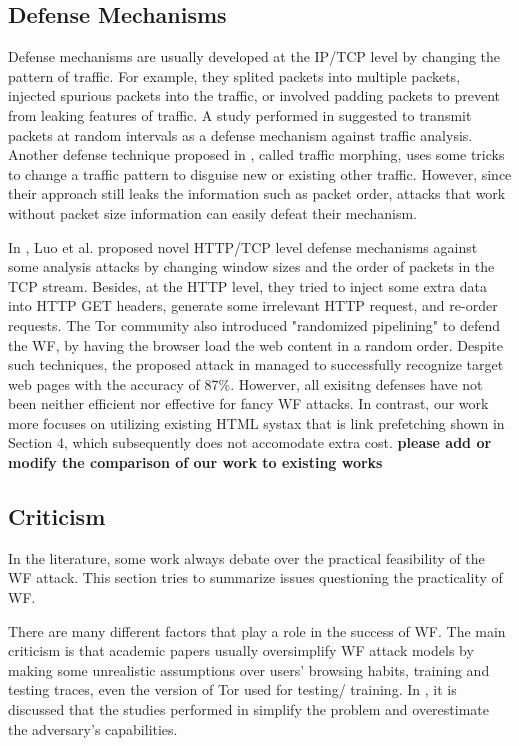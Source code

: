 \subsection{Defense Mechanisms}
Defense mechanisms are usually developed at the IP/TCP level by changing the pattern of traffic. For example, they splited packets into multiple packets, injected spurious packets into the traffic, or involved  padding packets to prevent from leaking features of traffic. A study performed in \cite{fu2003} suggested to transmit packets at random intervals as a defense mechanism against traffic analysis. Another defense technique proposed in \cite{wright2009}, called traffic morphing, uses some tricks to change a traffic pattern to disguise new or existing other traffic. However, since their approach still leaks the information such as packet order, attacks that work without packet size information can easily defeat their mechanism.

In \cite{luo2011}, Luo et al. proposed novel HTTP/TCP level defense mechanisms against some analysis attacks by changing window sizes and the order of packets in the TCP stream. Besides, at the HTTP level, they tried to inject some extra data into HTTP GET headers, generate some irrelevant HTTP request, and re-order requests. The Tor community also introduced "randomized pipelining" \cite{perry11} to defend the WF, by having the browser load the web content in a random order. Despite such techniques, the proposed attack in \cite{cai2012touching} managed to successfully recognize target web pages with the accuracy of 87\%. 
Howerver, all exisitng defenses have not been neither efficient nor effective for fancy WF attacks. %
In contrast, our work more focuses on utilizing existing HTML systax that is link prefetching shown in Section 4, which subsequently does not accomodate extra cost.
\textbf{please add  or modify the comparison of our work to existing works}

\subsection{Criticism}
In the literature, some work always debate over the practical feasibility of the WF attack. This section tries to summarize issues questioning the practicality of WF.

There are many different factors that play a role in the success of WF. The main criticism is that academic papers usually oversimplify WF attack models by making some unrealistic assumptions over users' browsing habits, training and testing traces, even the version of Tor used for testing/ training. In \cite{juarez14}, it is discussed that the studies performed in \cite{cai2012touching, herrmann2009, panchenko11, wang2013improved, shi2009} simplify the problem and overestimate the adversary's capabilities.

